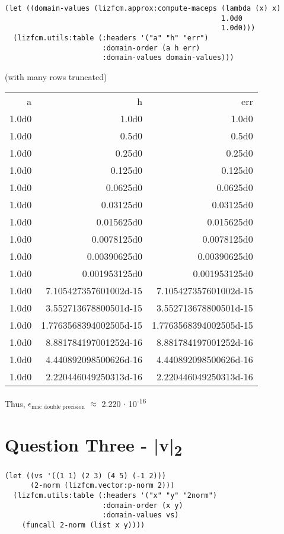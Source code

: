 \documentclass[11pt]{article}
\begin{document}
\begin{verbatim}
(let ((domain-values (lizfcm.approx:compute-maceps (lambda (x) x)
                                                   1.0d0
                                                   1.0d0)))
  (lizfcm.utils:table (:headers '("a" "h" "err")
                       :domain-order (a h err)
                       :domain-values domain-values)))
\end{verbatim}

(with many rows truncated)
\begin{center}
\begin{tabular}{rrr}
a & h & err\\[0pt]
1.0d0 & 1.0d0 & 1.0d0\\[0pt]
1.0d0 & 0.5d0 & 0.5d0\\[0pt]
1.0d0 & 0.25d0 & 0.25d0\\[0pt]
1.0d0 & 0.125d0 & 0.125d0\\[0pt]
1.0d0 & 0.0625d0 & 0.0625d0\\[0pt]
1.0d0 & 0.03125d0 & 0.03125d0\\[0pt]
1.0d0 & 0.015625d0 & 0.015625d0\\[0pt]
1.0d0 & 0.0078125d0 & 0.0078125d0\\[0pt]
1.0d0 & 0.00390625d0 & 0.00390625d0\\[0pt]
1.0d0 & 0.001953125d0 & 0.001953125d0\\[0pt]
1.0d0 & 7.105427357601002d-15 & 7.105427357601002d-15\\[0pt]
1.0d0 & 3.552713678800501d-15 & 3.552713678800501d-15\\[0pt]
1.0d0 & 1.7763568394002505d-15 & 1.7763568394002505d-15\\[0pt]
1.0d0 & 8.881784197001252d-16 & 8.881784197001252d-16\\[0pt]
1.0d0 & 4.440892098500626d-16 & 4.440892098500626d-16\\[0pt]
1.0d0 & 2.220446049250313d-16 & 2.220446049250313d-16\\[0pt]
\end{tabular}
\end{center}

Thus, \(\epsilon_{\text{mac double precision}}\) \(\approx\) 2.220 \(\cdot\) 10\textsuperscript{-16}

\section{Question Three - |v|\textsubscript{2}}
\label{sec:org59c6c10}
\begin{verbatim}
(let ((vs '((1 1) (2 3) (4 5) (-1 2)))
      (2-norm (lizfcm.vector:p-norm 2)))
  (lizfcm.utils:table (:headers '("x" "y" "2norm")
                       :domain-order (x y)
                       :domain-values vs)
    (funcall 2-norm (list x y))))
\end{verbatim}
\end{document}
